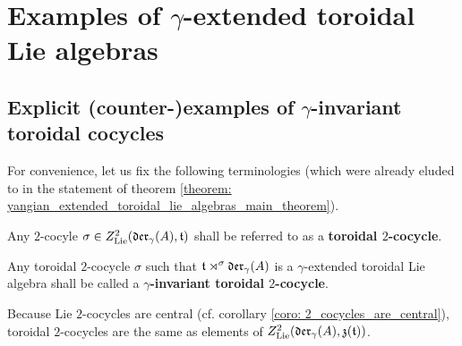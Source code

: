 \section{Examples of \texorpdfstring{$\gamma$}{}-extended toroidal Lie algebras}
    \subsection{Explicit (counter-)examples of $\gamma$-invariant toroidal cocycles}
        For convenience, let us fix the following terminologies (which were already eluded to in the statement of theorem \ref{theorem: yangian_extended_toroidal_lie_algebras_main_theorem}).
        \begin{definition} \label{def: yangian_toroidal_cocycles}
            Any $2$-cocyle $\sigma \in Z^2_{\mathrm{Lie}}(\mathfrak{der}_{\gamma}(A), \mathfrak{t})$ shall be referred to as a \textbf{toroidal $2$-cocycle}.
            
            Any toroidal $2$-cocycle $\sigma$ such that $\mathfrak{t} \rtimes^{\sigma} \mathfrak{der}_{\gamma}(A)$ is a $\gamma$-extended toroidal Lie algebra shall be called a \textbf{$\gamma$-invariant toroidal $2$-cocycle}.
        \end{definition}
        \begin{remark}
            Because Lie $2$-cocycles are central (cf. corollary \ref{coro: 2_cocycles_are_central}), toroidal $2$-cocycles are the same as elements of $Z^2_{\mathrm{Lie}}( \mathfrak{der}_{\gamma}(A), \mathfrak{z}(\mathfrak{t}) )$.
        \end{remark}
        
